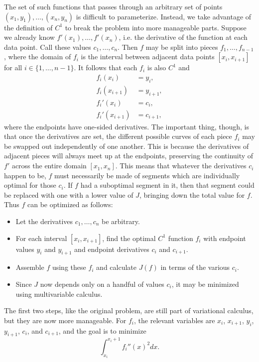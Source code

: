 \documentclass{article}
\begin{document}
The set of such functions that passes through an arbitrary set of points
$(x_1, y_1), \ldots, (x_n, y_n)$ is difficult to parameterize.
Instead, we take advantage of the definition of $C^1$
to break the problem into more manageable parts.
Suppose we already know $f'(x_1), \ldots, f'(x_n)$,
i.e. the derivative of the function at each data point.
Call these values $c_1, \ldots, c_n$.
Then $f$ may be split into pieces $f_1, \ldots, f_{n-1}$,
where the domain of $f_i$ is the interval between adjacent data points $[x_i, x_{i+1}]$
for all $i \in \{1, \ldots, n-1\}$.
It follows that each $f_i$ is also $C^1$ and
\begin{align*}
  f_i(x_i) &= y_i, \\
  f_i(x_{i+1}) &= y_{i+1}, \\
  f_i'(x_i) &= c_i, \\
  f_i'(x_{i+1}) &= c_{i+1},
\end{align*}
where the endpoints have one-sided derivatives.
The important thing, though, is that once the derivatives are set,
the different possible curves of each piece $f_i$
may be swapped out independently of one another.
This is because the derivatives of adjacent pieces will always meet up at the endpoints,
preserving the continuity of $f'$ across the entire domain $[x_1, x_n]$.
This means that whatever the derivatives $c_i$ happen to be,
$f$ must necessarily be made of segments which are individually optimal for those $c_i$.
If $f$ had a suboptimal segment in it,
then that segment could be replaced with one with a lower value of $J$,
bringing down the total value for $f$.
Thus $f$ can be optimized as follows:
\begin{itemize}
\item
  Let the derivatives $c_1, \ldots, c_n$ be arbitrary.
\item
  For each interval $[x_i, x_{i+1}]$, find the optimal $C^1$ function $f_i$
  with endpoint values $y_i$ and $y_{i+1}$
  and endpoint derivatives $c_i$ and $c_{i+1}$.
\item
  Assemble $f$ using these $f_i$ and calculate $J(f)$ in terms of the various $c_i$.
\item
  Since $J$ now depends only on a handful of values $c_i$,
  it may be minimized using multivariable calculus.
\end{itemize}

The first two steps, like the original problem, are still part of variational calculus,
but they are now more manageable.
For $f_i$, the relevant variables are
$x_i$, $x_{i+1}$, $y_i$, $y_{i+1}$, $c_i$, and $c_{i+1}$,
and the goal is to minimize
\[\int_{x_i}^{x_i+1}f_i''(x)^2 dx.\]
\end{document}
